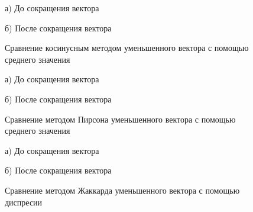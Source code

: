 \begin{figure}[H]
    \begin{minipage}[H]{0.5\linewidth}
        а) До сокращения вектора 
    \end{minipage}
    \begin{minipage}[H]{0.5\linewidth}
        б) После сокращения вектора 
    \end{minipage}
    \caption{Сравнение косинусным методом уменьшенного вектора с помощью среднего значения}
    \label{fig:heatmapMeanCosine}
\end{figure}

\begin{figure}[H]
    \begin{minipage}[H]{0.5\linewidth}
        а) До сокращения вектора 
    \end{minipage}
    \begin{minipage}[H]{0.5\linewidth}
        б) После сокращения вектора 
    \end{minipage}
    \caption{Сравнение методом Пирсона уменьшенного вектора с помощью среднего значения}
    \label{fig:heatmapMeanPearson}
\end{figure}

\begin{figure}[H]
    \begin{minipage}[H]{0.5\linewidth}
        а) До сокращения вектора 
    \end{minipage}
    \begin{minipage}[H]{0.5\linewidth}
        б) После сокращения вектора 
    \end{minipage}
    \caption{Сравнение методом Жаккарда уменьшенного вектора с помощью диспресии}
    \label{fig:heatmapVarJac}
\end{figure}

